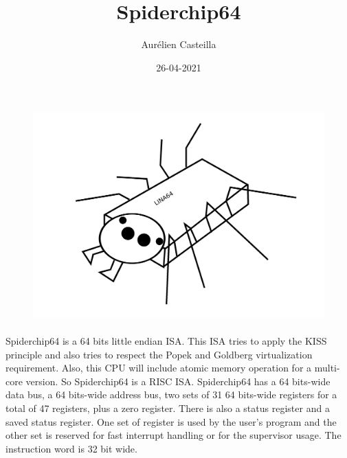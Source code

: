 \documentclass[12pt]{article}
\author{Aurélien Casteilla}
\date{26-04-2021}
\title{Spiderchip64}
\begin{document}
\maketitle
\begin{figure}[h!]
    \includegraphics[width=\linewidth]{mascotte.png}
\end{figure}
\newpage

\paragraph{}
        Spiderchip64 is a 64 bits little endian ISA. This ISA tries to apply
        the KISS principle and also tries to respect the Popek and Goldberg
        virtualization requirement. Also, this CPU will include atomic memory
        operation for a multi-core version. So Spiderchip64 is a RISC ISA.
        Spiderchip64 has a 64 bits-wide data bus, a 64 bits-wide address bus,
        two sets of 31 64 bits-wide registers for a total of 47 registers, plus
        a zero register.  There is also a status register and a saved status
        register. One set of register is used by the user's program and the
        other set is reserved for fast interrupt handling or for the supervisor
        usage. The instruction word is 32 bit wide.
        \setcounter{secnumdepth}{-1}
\end{document}
